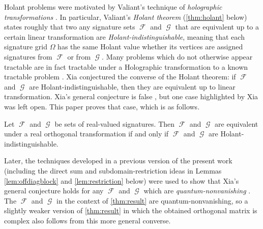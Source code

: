 \documentclass{theoretics}
\DeclareMathOperator{\fc}{\mathcal{F}}
\DeclareMathOperator{\gc}{\mathcal{G}}
\begin{document}
Holant problems were motivated by Valiant's technique of \emph{holographic
transformations} \cite{valiant}. In particular, Valiant's \emph{Holant theorem} (\autoref{thm:holant}
below) states roughly that two any signature sets $\fc$ and $\gc$ that are 
equivalent up to a certain 
linear transformation are \emph{Holant-indistinguishable}, meaning that each signature grid $\Omega$
has the same Holant value whether its vertices are assigned signatures from $\fc$ or from 
$\gc$.
Many problems which do not otherwise appear tractable are in fact tractable under a Holographic
transformation to a known tractable problem \cite{valiant_2006_accidental}.
Xia \cite{xia} conjectured the converse of the Holant theorem: if $\fc$ and
$\gc$ are Holant-indistinguishable, then they are equivalent up to linear transformation.
Xia's general conjecture is false \cite{cai_complete_2016}, but one case highlighted
by Xia was left open. This paper proves that case, which is as follows.
\begin{theorem}
    Let $\fc$ and $\gc$ be sets of real-valued signatures. Then $\fc$ and $\gc$ are equivalent under
    a real orthogonal transformation if and only if $\fc$ and $\gc$ are Holant-indistinguishable.
\end{theorem}
Later, the techniques developed in a previous version of
the present work 
\cite{orthogonal} (including the direct sum and subdomain-restriction ideas in
Lemmas \ref{lem:offdiagblock} and \ref{lem:restriction} below) were used
to show that Xia's general conjecture holds for any $\fc$ and
$\gc$ which are \emph{quantum-nonvanishing} \cite{bipartite}.
The $\fc$ and $\gc$ in the context of
\autoref{thm:result} are quantum-nonvanishing, so a slightly weaker version of 
\autoref{thm:result} in which the obtained orthogonal matrix is complex 
also follows from this more general converse. 
\end{document}
